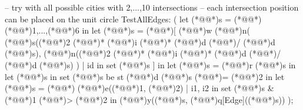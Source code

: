\documentclass[a4paper]{article}
\begin{document}
\begin{vdm_al}
    -- try with all possible cities with {2,...,10} intersections
    -- each intersection position can be placed on the unit circle
    TestAllEdges:
        (
            let (*@@*)s = (*@\vdmnotcovered{}@*){(*@\vdmnotcovered{}@*)1,...,(*@\vdmnotcovered{}@*)6} in
                let (*@@*)s = (*@\vdmnotcovered{}@*)[
                    (*@@*)w (*@@*)n(
                        (*@@*)s((*@\vdmnotcovered{}@*)2 (*@\vdmnotcovered{}@*)* (*@@*)i (*@\vdmnotcovered{}@*)* (*@@*)d (*@\vdmnotcovered{}@*)/ (*@@*)d (*@@*)s),
                        (*@@*)n((*@\vdmnotcovered{}@*)2 (*@\vdmnotcovered{}@*)* (*@@*)i (*@\vdmnotcovered{}@*)* (*@@*)d (*@\vdmnotcovered{}@*)/ (*@@*)d (*@@*)s)
                    )
                    | id in set (*@@*)s
                ] in
                    let (*@@*)s = (*@@*)r (*@@*)s in
                        let (*@@*)s in set (*@@*)s
                        be st (*@@*)d (*@@*)s (*@\vdmnotcovered{>}@*)= (*@\vdmnotcovered{}@*)2 in
                            let (*@@*)s = (*@\vdmnotcovered{}@*){
                                (*@@*)e((*@@*)1, (*@@*)2)
                                | i1, i2 in set (*@@*)s
                                & (*@@*)1 (*@\vdmnotcovered{<}@*)> (*@@*)2
                            } in (*@@*)y((*@@*)s, (*@@*)q[Edge]((*@@*)s))
        );


\end{vdm_al}
\end{document}
